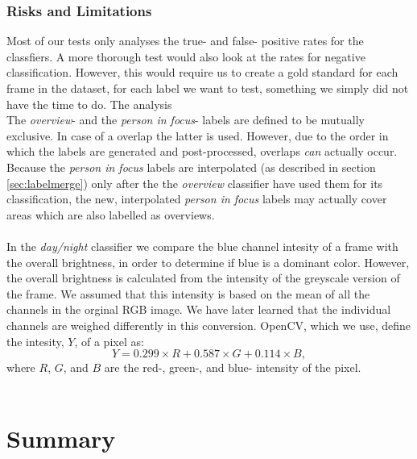 \subsubsection{Risks and Limitations}
%
Most of our tests only analyses the true- and false- positive rates for the classfiers. A more thorough test would also look at the rates for negative classification. However, this would require us to create a gold standard for each frame in the dataset, for each label we want to test, something we simply did not have the time to do. The analysis 
\\
The \textit{overview}- and the \textit{person in focus}- labels are defined to be mutually exclusive. In case of a overlap the latter is used. However, due to the order in which the labels are generated and post-processed, overlaps \textit{can} actually occur. Because the \textit{person in focus} labels are interpolated (as described in section \ref{sec:labelmerge}) only after the the \textit{overview} classifier have used them for its classification, the new, interpolated \textit{person in focus} labels may actually cover areas which are also labelled as overviews.\\
\\
In the \textit{day/night} classifier we compare the blue channel intesity of a frame with the overall brightness, in order to determine if blue is a dominant color. However, the overall brightness is calculated from the intensity of the greyscale version of the frame. We assumed that this intensity is based on the mean of all the channels in the orginal RGB image. We have later learned that the individual channels are weighed differently in this conversion. OpenCV, which we use, define the intesity, $Y$, of a pixel as:
%
\[
Y = 0.299 \times R + 0.587 \times  G + 0.114 \times B,
\]
%
where $R$, $G$, and $B$ are the red-, green-, and blue- intensity of the pixel.\\
\\

%
\section{Summary}
%
